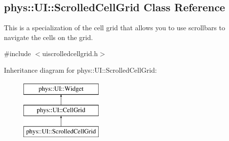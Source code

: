 \hypertarget{classphys_1_1UI_1_1ScrolledCellGrid}{
\subsection{phys::UI::ScrolledCellGrid Class Reference}
\label{classphys_1_1UI_1_1ScrolledCellGrid}
}


This is a specialization of the cell grid that allows you to use scrollbars to navigate the cells on the grid.  




{\ttfamily \#include $<$uiscrolledcellgrid.h$>$}

Inheritance diagram for phys::UI::ScrolledCellGrid:\begin{figure}[H]
\begin{center}
\leavevmode
\includegraphics[height=3.000000cm]{classphys_1_1UI_1_1ScrolledCellGrid}
\end{center}
\end{figure}
